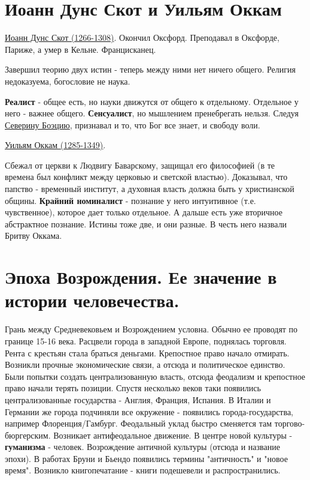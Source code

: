 \section{Иоанн Дунс Скот и Уильям Оккам}
\underline{Иоанн Дунс Скот (1266-1308)}. Окончил Оксфорд. Преподавал в Оксфорде, Париже, а умер в Кельне. Францисканец.

Завершил теорию двух истин - теперь между ними нет ничего общего. Религия недоказуема, богословие не наука. 

\textbf{Реалист} - общее есть, но науки движутся от общего к отдельному. Отдельное у  него - важнее общего. \textbf{Сенсуалист}, но мышлением пренебрегать нельзя. Следуя \underline{Северину Боэцию}, признавал и то, что Бог все знает, и свободу воли.  
 
\underline{Уильям Оккам (1285-1349)}. 

Сбежал от церкви к Людвигу Баварскому, защищал его философией (в те времена был конфликт между церковью и светской властью). Доказывал, что папство - временный институт, а духовная власть должна быть у христианской общины. \textbf{Крайний номиналист} - познание у него интуитивное (т.е. чувственное), которое дает только отдельное. А дальше есть уже вторичное абстрактное познание. Истины тоже две, и они разные. В честь него назвали Бритву Оккама.

\section{Эпоха Возрождения. Ее значение в истории человечества.}
Грань между Средневековьем и Возрождением условна. Обычно ее проводят по границе 15-16 века. Расцвели города в западной Европе, поднялась торговля. Рента с крестьян стала браться деньгами. Крепостное право начало отмирать. Возникли прочные экономические связи, а отсюда и политическое единство. Были попытки создать централизованную власть, отсюда феодализм и крепостное право начали терять позиции. Спустя несколько веков таки появились централизованные государства - Англия, Франция, Испания. В Италии и Германии же города подчиняли все окружение - появились города-государства, например Флоренция/Гамбург. Феодальный уклад быстро сменяется там торгово-бюргерским. Возникает антифеодальное движение. В центре новой культуры - \textbf{гуманизма} - человек. Возрождение античной культуры (отсюда и название эпохи). В работах Бруни и Бьендо появились термины "античность" и "новое время". Возникло книгопечатание - книги подешевели и распространились. 

